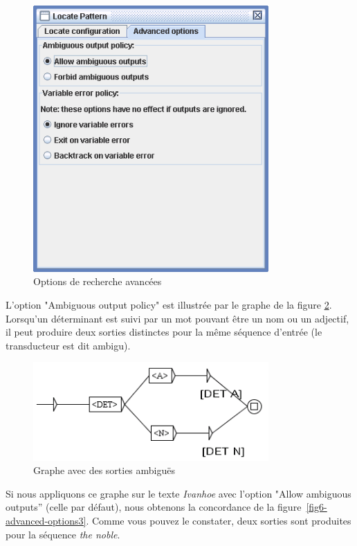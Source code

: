 \begin{figure}[!ht]
\begin{center}
\includegraphics[width=9cm]{resources/img/fig6-advanced-options1.png}
\caption{Options de recherche avancées\label{fig6-advanced-options1}}
\end{center}
\end{figure}

\bigskip
{}
\noindent L'option "Ambiguous output policy" est illustrée par le graphe de la 
figure \ref{fig6-advanced-options2}. Lorsqu'un déterminant est suivi par un mot pouvant être un
nom ou un adjectif, il peut produire deux sorties distinctes pour la même séquence d'entrée
(le transducteur est dit ambigu).

\bigskip
\begin{figure}[!ht]
\begin{center}
\includegraphics[width=9cm]{resources/img/fig6-advanced-options2.png}
\caption{Graphe avec des sorties ambiguës\label{fig6-advanced-options2}}
\end{center}
\end{figure}

\noindent Si nous appliquons ce graphe sur le texte \textit{Ivanhoe} avec l'option "Allow ambiguous outputs''
(celle par défaut), nous obtenons la concordance de la figure~\ref{fig6-advanced-options3}. Comme vous pouvez le constater, deux sorties sont produites pour la séquence \textit{the noble}.

